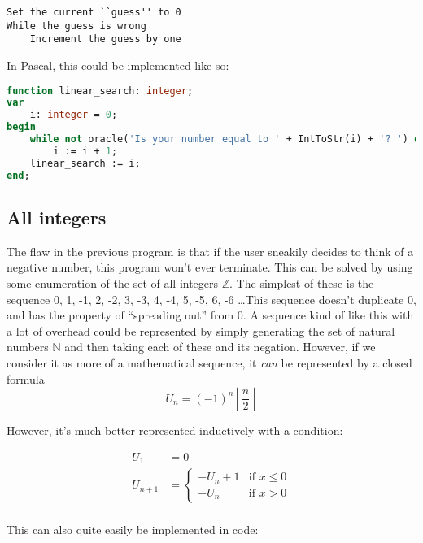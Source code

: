 \documentclass{article}
\begin{document}
\begin{lstlisting}[caption=Linear search on $\mathbb{N}$ pseudocode]
Set the current ``guess'' to 0
While the guess is wrong
    Increment the guess by one
\end{lstlisting}

    In Pascal, this could be implemented like so:

\begin{lstlisting}[language=Pascal, caption=Linear search on $\mathbb{N}$ implementation]
function linear_search: integer;
var
    i: integer = 0;
begin
    while not oracle('Is your number equal to ' + IntToStr(i) + '? ') do
		i := i + 1;
    linear_search := i;
end;
\end{lstlisting}

    \subsection{All integers}
    The flaw in the previous program is that if the user sneakily decides to
    think of a negative number, this program won't ever terminate. This can be
    solved by using some enumeration of the set of all integers $\mathbb{Z}$.
    The simplest of these is the sequence 0, 1, -1, 2, -2, 3, -3, 4, -4, 5, -5,
    6, -6 \ldots This sequence doesn't duplicate 0, and has the property of
    ``spreading out'' from 0. A sequence kind of like this with a lot of
    overhead could be represented by simply generating the set of natural
    numbers $\mathbb{N}$ and then taking each of these and its negation. However,
    if we consider it as more of a mathematical sequence, it \textit{can} be
    represented by a closed formula
    \begin{equation}
    U_n = (-1)^n \left\lfloor \frac{n}{2} \right\rfloor
    \end{equation}

    However, it's much better represented inductively with a condition:

	\begin{align*}
        U_1 &= 0\\
		U_{n + 1} &= 
		\begin{cases}
			-U_n + 1        & \text{if } x \leq 0\\
			-U_n            & \text{if } x > 0
		\end{cases}\\
	\end{align*}

    This can also quite easily be implemented in code:
\end{document}

